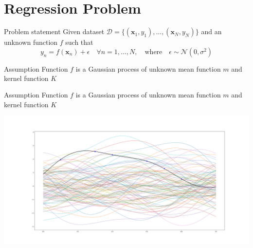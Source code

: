 \documentclass[10pt]{beamer}
\begin{document}
\section{Regression Problem}
\begin{frame}{Problem statement}
    Given dataset \( \mathcal{D} = \{(\bm x_1, y_1), \dots, (\bm x_N, y_N)\} \) and an unknown function \( f \) such that
    \[
         y_n = f(\bm x_n) + \epsilon\quad \forall n=1,\dots,N, \quad \text{where} \quad \epsilon \sim \mathcal{N}(0, \sigma^2)
    \] 

    \begin{alertblock}{Assumption}
            Function \( f \) is a Gaussian process of unknown mean function \( m \) and kernel function \( K \)
    \end{alertblock}
\end{frame}


\begin{frame}
    \begin{alertblock}{Assumption}
    Function \( f \) is a Gaussian process of unknown mean function \( m \) and kernel function \( K \)
    \end{alertblock}

    \centering
    \includegraphics[scale=0.17]{imgs/funct_as_gp.png}
\end{frame}
\end{document}
